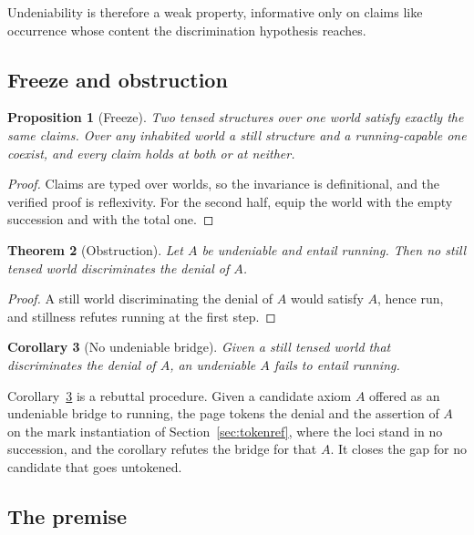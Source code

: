 \documentclass[11pt]{article}
\newtheorem{theorem}{Theorem}[section]
\newtheorem{proposition}[theorem]{Proposition}
\newtheorem{corollary}[theorem]{Corollary}
\begin{document}
Undeniability is therefore a weak property, informative only on claims like occurrence whose content the discrimination hypothesis reaches.

\subsection{Freeze and obstruction}

\begin{proposition}[Freeze]
\label{prop:freeze}
Two tensed structures over one world satisfy exactly the same claims. Over any inhabited world a still structure and a running-capable one coexist, and every claim holds at both or at neither.
\end{proposition}

\begin{proof}
Claims are typed over worlds, so the invariance is definitional, and the verified proof is reflexivity. For the second half, equip the world with the empty succession and with the total one.
\end{proof}

\begin{theorem}[Obstruction]
\label{thm:obstruction}
Let $A$ be undeniable and entail running. Then no still tensed world discriminates the denial of $A$.
\end{theorem}

\begin{proof}
A still world discriminating the denial of $A$ would satisfy $A$, hence run, and stillness refutes running at the first step.
\end{proof}

\begin{corollary}[No undeniable bridge]
\label{cor:nobridge}
Given a still tensed world that discriminates the denial of $A$, an undeniable $A$ fails to entail running.
\end{corollary}

Corollary~\ref{cor:nobridge} is a rebuttal procedure. Given a candidate axiom $A$ offered as an undeniable bridge to running, the page tokens the denial and the assertion of $A$ on the mark instantiation of Section~\ref{sec:tokenref}, where the loci stand in no succession, and the corollary refutes the bridge for that $A$. It closes the gap for no candidate that goes untokened.

\subsection{The premise}
\label{sec:premise}
\end{document}
